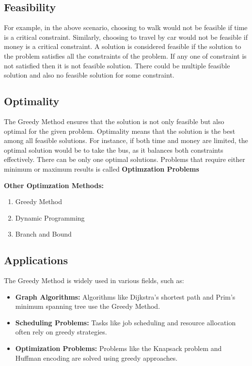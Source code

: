 \documentclass[11pt, a4paper]{article}
\begin{document}
\subsection{Feasibility}
For example, in the above scenario, choosing to walk would not be feasible if time is a critical constraint. Similarly, choosing to travel by car would not be feasible if money is a critical constraint. A solution is considered feasible if the solution to the problem satisfies all the constraints of the problem. If any one of constraint is not satisfied then it is not feasible solution. There could be multiple feasible solution and also no feasible solution for some constraint. 

\subsection{Optimality}
The Greedy Method ensures that the solution is not only feasible but also optimal for the given problem. Optimality means that the solution is the best among all feasible solutions. For instance, if both time and money are limited, the optimal solution would be to take the bus, as it balances both constraints effectively. There can be only one optimal solutions. 
Problems that require either minimum or maximum results is called \textbf{Optimzation Problems}

\textbf{Other Optimzation Methods:}
\begin{enumerate}
    \item Greedy Method
    \item Dynamic Programming
    \item Branch and Bound
\end{enumerate}

\subsection{Applications}
The Greedy Method is widely used in various fields, such as:
\begin{itemize}
    \item \textbf{Graph Algorithms:} Algorithms like Dijkstra's shortest path and Prim's minimum spanning tree use the Greedy Method.
    \item \textbf{Scheduling Problems:} Tasks like job scheduling and resource allocation often rely on greedy strategies.
    \item \textbf{Optimization Problems:} Problems like the Knapsack problem and Huffman encoding are solved using greedy approaches.
\end{itemize}
\end{document}
